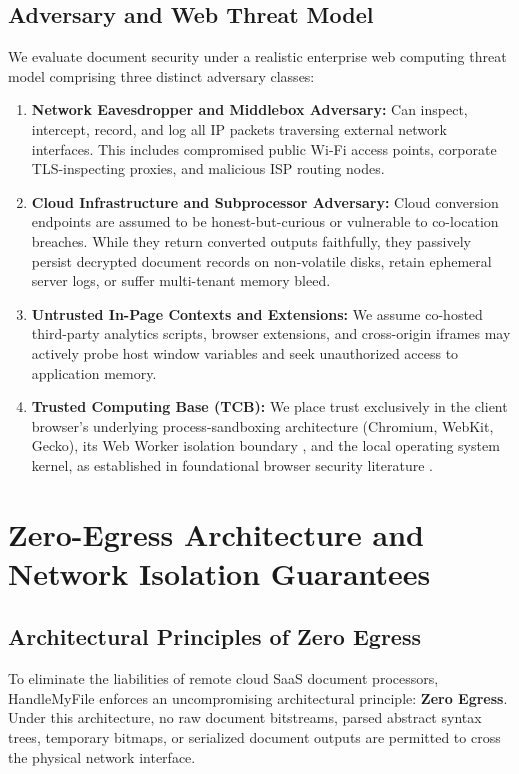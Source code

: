 \documentclass[journal]{IEEEtran}
\begin{document}
\subsection{Adversary and Web Threat Model}
We evaluate document security under a realistic enterprise web computing threat model comprising three distinct adversary classes:
\begin{enumerate}[leftmargin=12pt, topsep=2pt, itemsep=1pt]
\item \textbf{Network Eavesdropper and Middlebox Adversary:} Can inspect, intercept, record, and log all IP packets traversing external network interfaces. This includes compromised public Wi-Fi access points, corporate TLS-inspecting proxies, and malicious ISP routing nodes.
\item \textbf{Cloud Infrastructure and Subprocessor Adversary:} Cloud conversion endpoints are assumed to be honest-but-curious or vulnerable to co-location breaches. While they return converted outputs faithfully, they passively persist decrypted document records on non-volatile disks, retain ephemeral server logs, or suffer multi-tenant memory bleed.
\item \textbf{Untrusted In-Page Contexts and Extensions:} We assume co-hosted third-party analytics scripts, browser extensions, and cross-origin iframes may actively probe host window variables and seek unauthorized access to application memory.
\item \textbf{Trusted Computing Base (TCB):} We place trust exclusively in the client browser's underlying process-sandboxing architecture (Chromium, WebKit, Gecko), its Web Worker isolation boundary \cite{whatwg2024workers}, and the local operating system kernel, as established in foundational browser security literature \cite{jang2012quark, banescu2016code}.
\end{enumerate}

\section{Zero-Egress Architecture and Network Isolation Guarantees}

\subsection{Architectural Principles of Zero Egress}
To eliminate the liabilities of remote cloud SaaS document processors, HandleMyFile enforces an uncompromising architectural principle: \textbf{Zero Egress}. Under this architecture, no raw document bitstreams, parsed abstract syntax trees, temporary bitmaps, or serialized document outputs are permitted to cross the physical network interface.
\end{document}
